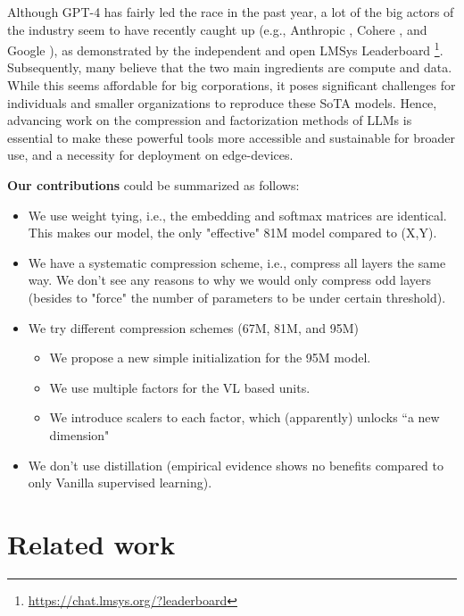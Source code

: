 \documentclass{article}
\begin{document}
Although GPT-4 \cite{achiam2023gpt} has fairly led the race in the past year, a lot of the big actors of the industry seem to have recently caught up (e.g., Anthropic \cite{claude3}, Cohere \cite{cmd}, and Google \cite{reid2024gemini}), as demonstrated by the independent and open LMSys Leaderboard \footnote{\href{https://chat.lmsys.org/?leaderboard}{https://chat.lmsys.org/?leaderboard}}. Subsequently, many believe that the two main ingredients are compute and data. While this seems affordable for big corporations, it poses significant challenges for individuals and smaller organizations to reproduce these SoTA models. Hence, advancing work on the compression and factorization methods of LLMs is essential to make these powerful tools more accessible and sustainable for broader use, and a necessity for deployment on edge-devices.

\textbf{Our contributions} could be summarized as follows:
\begin{itemize}
    \item We use weight tying, i.e., the embedding and softmax matrices are identical. This makes our model, the only "effective" 81M model compared to (X,Y).
    \item We have a systematic compression scheme, i.e., compress all layers the same way. We don't see any reasons to why we would only compress odd layers (besides to "force" the number of parameters to be under certain threshold).
    \item We try different compression schemes (67M, 81M, and 95M)
		\begin{itemize}
			\item We propose a new simple initialization for the 95M model.
			\item We use multiple factors for the VL based units.
			\item We introduce scalers to each factor, which (apparently) unlocks ``a new dimension"
		\end{itemize}
    \item We don't use distillation (empirical evidence shows no benefits compared to only Vanilla supervised learning).
\end{itemize}

\section{Related work}%
\label{sec:Related work}
\end{document}
